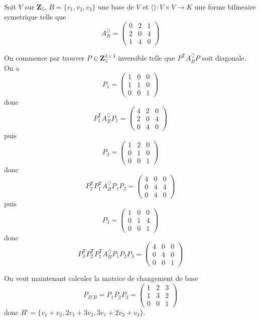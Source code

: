 \begin{example}
Soit $V$ sur $\mathbf{Z}_{5}$, $B=\{ v_{1},v_{2},v_{3} \}$ une base de $V$ et $\langle  \rangle:V\times V\to K$ une forme bilineaire symetrique telle que 
$$
A_{B}^{\langle  \rangle }=\begin{pmatrix}
0 & 2 & 1 \\
2 & 0 & 4 \\
1 & 4 & 0
\end{pmatrix}
$$

On commence par trouver $P\in \mathbf{Z}_{5}^{3\times 3}$  inversible telle que $P^{\mathsf{T}}A_{B}^{\langle  \rangle}P$ soit diagonale. On a 
$$
P_{1}=\begin{pmatrix}
1 & 0 & 0 \\
1 & 1 & 0 \\
0 & 0 & 1
\end{pmatrix}
$$
donc 
$$
P_{1}^{\mathsf{T}}A_{B}^{\langle  \rangle }P_{1}=\begin{pmatrix}
4 & 2 & 0 \\
2 & 0 & 4 \\
0 & 4 & 0
\end{pmatrix}
$$
puis
$$
P_{2}=\begin{pmatrix}
1 & 2 & 0 \\
0 & 1 & 0 \\
0 & 0 & 1
\end{pmatrix}
$$
donc
$$
P_{2}^{\mathsf{T}}P_{1}^{\mathsf{T}}A_{B}^{\langle  \rangle }P_{1}P_{2}=\begin{pmatrix}
4 & 0 & 0  \\
0 & 4 & 4 \\
0 & 4 & 0
\end{pmatrix}
$$
puis
$$
P_{3}=\begin{pmatrix}
1 & 0 & 0 \\
0 & 1 & 4 \\
0 & 0 & 1
\end{pmatrix}
$$
donc
$$
P_{3}^{\mathsf{T}}P_{2}^{\mathsf{T}}P_{1}^{\mathsf{T}}A_{B}^{\langle  \rangle }P_{1}P_{2}P_{3}=\begin{pmatrix}
4 & 0 & 0 \\
0 & 4 & 0 \\
0 & 0 & 1
\end{pmatrix}
$$

On veut maintenant calculer la matrice de changement de base
$$
P_{B'B}=P_{1}P_{2}P_{3}=\begin{pmatrix}
1 & 2 & 3 \\
1 & 3 & 2 \\
0 & 0 & 1
\end{pmatrix}
$$
donc $B'=\{ v_{1}+v_{2},2v_{1}+3v_{2},3v_{1}+2v_{2}+v_{3} \}$.
\end{example}


